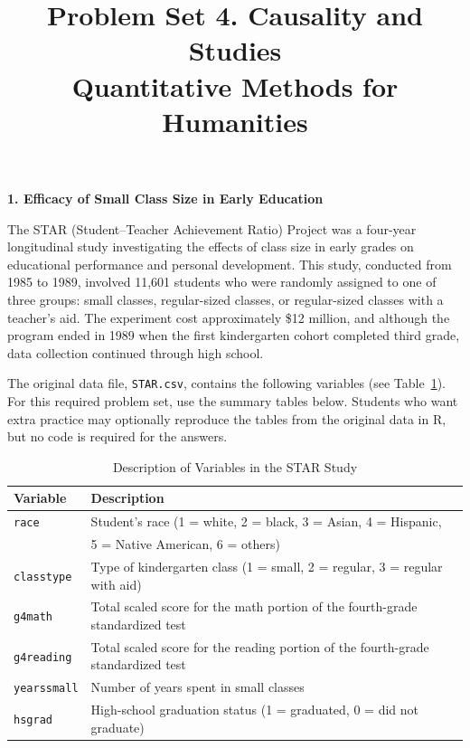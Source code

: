 \documentclass[12pt]{article}
\author{\empty}
\title{Problem Set 4. Causality and Studies \\ Quantitative Methods for Humanities}
\date{\empty}
\begin{document}
\maketitle

\begin{center}
    \textbf{\large 1. Efficacy of Small Class Size in Early Education}    
\end{center}

The STAR (Student–Teacher Achievement Ratio) Project was a four-year longitudinal study investigating the effects of class size in early grades on educational performance and personal development. This study, conducted from 1985 to 1989, involved 11,601 students who were randomly assigned to one of three groups: small classes, regular-sized classes, or regular-sized classes with a teacher's aid. The experiment cost approximately \$12 million, and although the program ended in 1989 when the first kindergarten cohort completed third grade, data collection continued through high school.

The original data file, \texttt{STAR.csv}, contains the following variables (see Table~\ref{tab:star-data}). For this required problem set, use the summary tables below. Students who want extra practice may optionally reproduce the tables from the original data in R, but no code is required for the answers.

\begin{table}[H]
\centering
\caption{Description of Variables in the STAR Study}\label{tab:star-data}
\begin{tabular}{ll}
\toprule
\textbf{Variable} & \textbf{Description} \\
\midrule
\texttt{race} & Student’s race (1 = white, 2 = black, 3 = Asian, 4 = Hispanic, \\
              & 5 = Native American, 6 = others) \\
\texttt{classtype} & Type of kindergarten class (1 = small, 2 = regular, 3 = regular with aid) \\
\texttt{g4math} & Total scaled score for the math portion of the fourth-grade standardized test \\
\texttt{g4reading} & Total scaled score for the reading portion of the fourth-grade standardized test \\
\texttt{yearssmall} & Number of years spent in small classes \\
\texttt{hsgrad} & High-school graduation status (1 = graduated, 0 = did not graduate) \\
\bottomrule
\end{tabular}
\end{table}
\end{document}
